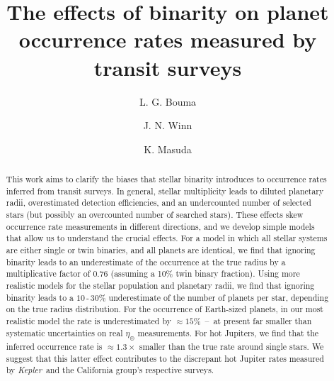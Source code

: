 \documentclass[12pt,modern]{aastex61}
\begin{document}
    
\title{ The effects of binarity on planet occurrence rates measured by transit 
surveys}
%
%
\author{L. G. Bouma}
\author{J. N. Winn}
\author{K. Masuda}
%
%
\begin{abstract}
%
This work aims to clarify the biases that stellar binarity introduces
to occurrence rates inferred from transit surveys.
In general, stellar multiplicity leads to diluted planetary 
radii, overestimated detection efficiencies, and an undercounted number of 
selected stars (but possibly an overcounted number of searched stars).
These effects skew occurrence rate measurements in different directions, and 
we develop simple models that allow us to understand the crucial effects.
For a model in which all stellar systems are either single or twin binaries, 
and all planets are identical, we find that ignoring binarity leads to an 
underestimate of the occurrence at the true radius by a multiplicative factor 
of $0.76$ (assuming a 10\% twin binary fraction).
Using more realistic models for the stellar population and planetary 
radii, we find that ignoring binarity leads to a $10$\,-\,$30\%$ 
underestimate of the number of planets per star, depending on the true radius 
distribution.
For the occurrence of Earth-sized planets, in our most realistic model the 
rate is underestimated by $\approx 15\%$~--~at present far smaller than 
systematic uncertainties on real $\eta_\oplus$ measurements.
For hot Jupiters, we find that the inferred occurrence rate is 
$\approx 1.3\times$ smaller than the true rate around single stars.
We suggest that this latter effect contributes to the discrepant hot Jupiter 
rates measured by {\it Kepler}\ and the California group's respective surveys.
%
\end{abstract}
%
%
%









\newpage
                            
 
\end{document}

